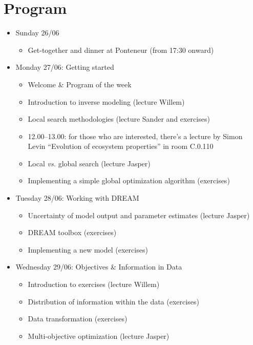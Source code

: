 \chapter{Program}
\thispagestyle{fancy}
\label{ch:program}



\begin{itemize}
\scriptsize
\item[]{Sunday 26/06}
\begin{itemize}
\item{Get-together and dinner at Ponteneur (from 17:30 onward)}
\end{itemize}
\item[]{Monday 27/06: Getting started}
\begin{itemize}
\item{Welcome \& Program of the week}
\item{Introduction to inverse modeling (lecture Willem)}
\item{Local search methodologies (lecture Sander and exercises)}
\item{12.00--13.00: for those who are interested, there's a lecture by Simon Levin ``Evolution of ecosystem properties'' in room C.0.110}
\item{Local \textit{vs.} global search (lecture Jasper)}
\item{Implementing a simple global optimization algorithm (exercises)}
\end{itemize}
\item[]{Tuesday 28/06: Working with DREAM}
\begin{itemize}
\item{Uncertainty of model output and parameter estimates (lecture Jasper)}
\item{DREAM toolbox (exercises)}
\item{Implementing a new model (exercises)}
\end{itemize}
\item[]{Wednesday 29/06: Objectives \& Information in Data}%
\begin{itemize}
\item{Introduction to exercises (lecture Willem)}
\item{Distribution of information within the data (exercises)}
\item{Data transformation (exercises)}
\item{Multi-objective optimization (lecture Jasper)}

\end{itemize}
\end{itemize}
